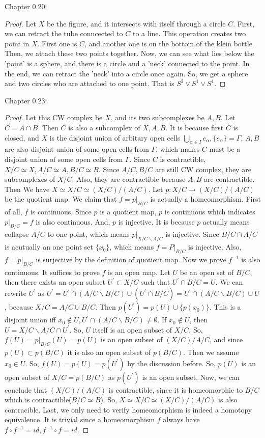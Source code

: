 \documentclass[]{book}
\theoremstyle{definition}
\begin{document}
Chapter 0.20:
\begin{proof}
    Let $X$ be the figure, and it intersects with itself through a circle $C$. First, we can retract the tube conncected to $C$ to a line. This operation creates two point in $X$. First one is $C$, and another one is on the bottom of the klein bottle. Then, we attach these two points together. Now, we can see what lies below the 'point' is a sphere, and there is a circle and a 'neck' connected to the point. In the end, we can retract the 'neck' into a circle once again. So, we get a sphere and two circles who are attached to one point. That is $S^2 \vee S^1 \vee S^1$.
   
    
\end{proof}

Chapter 0.23:
\begin{proof}
    Let this CW complex be $X$, and its two subcomplexes be $A,B$. Let $C=A\cap B $. Then $C$ is also a subcomplex of $X,A,B$. It is because first $C$ is closed, and $X$ is the disjoint union of arbitary open cells $\bigcup\limits_{\alpha \in I}e_\alpha, \{e_\alpha\}=\Gamma$, $A,B$ are also disjoint union of some open cells from $\Gamma$, which makes $C$ must be a disjoint union of some open cells from $\Gamma$. Since $C$ is contractible, $X/C \simeq X, A/C \simeq A, B/C \simeq B$. Since $A/C,B/C$ are still CW complex, they are subcomplexes of $X/C$. Also, they are contractible because $A,B$ are contractible. Then We have $X\simeq X/C \simeq (X/C)/(A/C)$. Let $p : X/C \to (X/C)/(A/C)$ be the quotient map. We claim that $f=p|_{B/C}$ is actually a homeomorphism. First of all, $f$ is continuous. Since $p$ is a quotient map, $p $ is continuous which indicates $p|_{B/C}=f$ is also continuous. And, $p$ is injective. It is because $p$ actually means collapse $A/C$ to one point, which means $p|_{X/C\backslash A/C}$ is injective. Since $B/C \cap A/C$ is acutually an one point set $\{ x_0\}$, which means $f=P|_{B/C}$ is injective. Also, $f=p|_{B/C}$ is surjective by the definition of quotient map. Now we prove $f^{-1}$ is also continuous. It suffices to prove $f$ is an open map. Let $U$ be an open set of $B/C$, then there exists an open subset $U^{'} \subset X/C$ such that $U^{'} \cap B/C =U$. We can rewrite $U^{'}$ as $U^{'}= U^{'}\cap (A/C \backslash B/C) \cup (U^{'}\cap B/C)=U^{'}\cap (A/C \backslash B/C) \cup U$, because $X/C =A/C \cup B/C$. Then $p(U^{'})= p(U) \cup \{p(x_0)\}$. This is a disjoint union iff $x_0 \notin U, U^{'}\cap (A/C \backslash B/C)\neq \emptyset $. If $x_0 \notin U$, then $U= X/C \backslash A/C \cap U^{{'}}$. So, $U$ itself is an open subset of $X/C$. So, $f(U)=p|_{B/C}(U)=p(U)$ is an open subset of $(X/C)/A/C$, and since $p(U) \subset p(B/C)$ it is also an open subset of $p(B/C)$. Then we assume $x_0 \in U$. So, $f(U)=p(U)=p(U^{'})$ by the discussion before. So, $p(U)$ is an open subset of $X/C=p(B/C)$ as $p(U^{'})$ is an open subset. Now, we can conclude that $(X/C)/(A/C)$ is contractible, since it is homeomorphic to $B/C$ which is contractible($B/C\simeq B$). So, $X\simeq X/C \simeq (X/C)/(A/C)$ is also contracible. Last, we only need to verify homeomorphism is indeed a homotopy equivalence. It is trivial since a homeomorphism $f$ always have $f\circ f^{-1}=id, f^{-1} \circ f =id$.
\end{proof}
\end{document}
